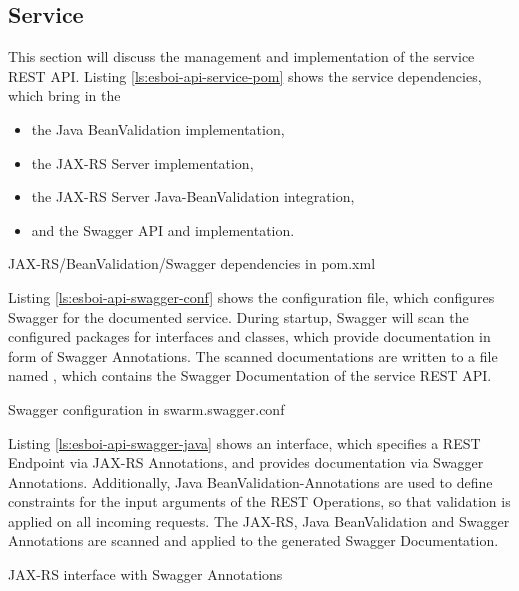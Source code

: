 \subsection{Service}
\label{sec:esbi-api-service}
This section will discuss the management and implementation of the service REST API. Listing \vref{ls:esboi-api-service-pom} shows the service dependencies, which bring in the 
\begin{itemize}
	\item the Java BeanValidation implementation, 
	\item the JAX-RS Server implementation,
	\item the JAX-RS Server Java-BeanValidation integration,
	\item and the Swagger API and implementation. 
\end{itemize}

\begin{listing}[h]
	\caption{JAX-RS/BeanValidation/Swagger dependencies in pom.xml}
	\label{ls:esboi-api-service-pom}
\end{listing}

Listing \vref{ls:esboi-api-swagger-conf} shows the  configuration file, which configures Swagger for the documented service. During startup, Swagger will scan the configured packages for interfaces and classes, which provide documentation in form of Swagger Annotations. The scanned documentations are written to a file named , which contains the Swagger Documentation of the service REST API.    

\begin{listing}[h]
	\caption{Swagger configuration in swarm.swagger.conf}
	\label{ls:esboi-api-swagger-conf}
\end{listing}

Listing \vref{ls:esboi-api-swagger-java} shows an interface, which specifies a REST Endpoint via JAX-RS Annotations, and provides documentation via Swagger Annotations. Additionally, Java BeanValidation-Annotations are used to define constraints for the input arguments of the REST Operations, so that validation is applied on all incoming requests. The JAX-RS, Java BeanValidation and Swagger Annotations are scanned and applied to the generated Swagger Documentation.

\begin{listing}[h]
	\caption{JAX-RS interface with Swagger Annotations}
	\label{ls:esboi-api-swagger-java}
\end{listing}

